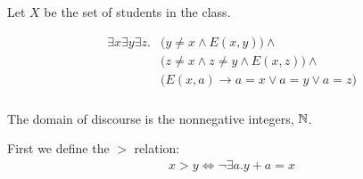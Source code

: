 \documentclass[12pt]{article}
\begin{document}
Let $X$ be the set of students in the class.

\begin{align*}
  \exists x \exists y \exists z.
  &\Big(y \neq x \land E(x, y)\Big) \land\\
  &\Big(z \neq x \land z \neq y \land E(x, z)\Big) \land\\
  &\Big(E(x, a) \rightarrow a = x \lor a = y \lor a = z\Big)
\end{align*}

\subsubsection*{}
The domain of discourse is the nonnegative integers, $\mathbb{N}$.

First we define the $>$ relation:
\begin{align*}
  x > y \iff \neg\exists a. y + a = x
\end{align*}
\end{document}
